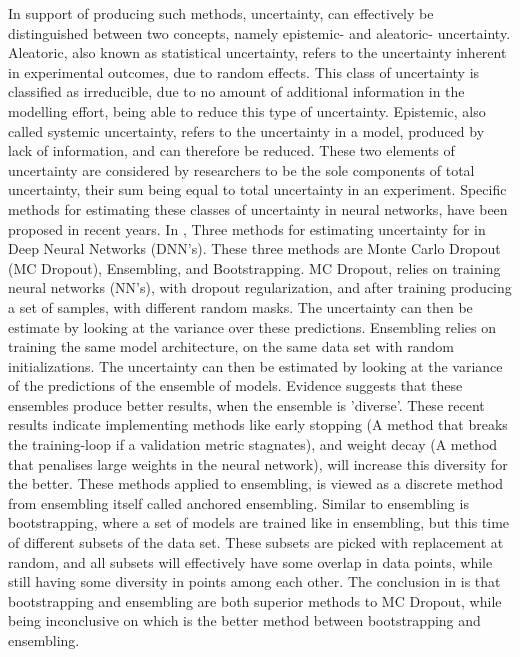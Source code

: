 In support of producing such methods, uncertainty, can effectively be distinguished between two concepts,
namely epistemic- and aleatoric- uncertainty\cite{Busk2021}\cite{AleatoricAndEpistemic}. Aleatoric, also known as statistical
uncertainty, refers to the uncertainty inherent in experimental outcomes, due to random effects. This class of uncertainty is
classified as irreducible, due to no amount of additional information in the modelling effort, being able to reduce this type
of uncertainty\cite{AleatoricAndEpistemic}. Epistemic, also called systemic uncertainty, refers to the uncertainty in a model,
produced by lack of information, and can therefore be reduced. These two elements of uncertainty are considered by researchers
to be the sole components of total uncertainty, their sum being equal to total uncertainty in an
experiment\cite{AleatoricAndEpistemic}. Specific methods for estimating these classes of uncertainty in neural networks,
have been proposed in recent years. In \cite{Scalia2019}, Three methods for estimating
uncertainty for in Deep Neural Networks (DNN's). These three methods are Monte Carlo Dropout (MC Dropout), Ensembling, and Bootstrapping.
MC Dropout, relies on training neural networks (NN's), with dropout regularization, and after training producing a set of samples,
with different random masks. The uncertainty can then be estimate by looking at the variance over these predictions.
Ensembling relies on training the same model architecture, on the same data set with random initializations.
The uncertainty can then be estimated by looking at the variance of the predictions of the ensemble of models.
Evidence suggests that these ensembles produce better results, when the ensemble is 'diverse'\cite{Pearce2018}.
These recent results indicate implementing methods like early stopping (A method that breaks the training-loop if a validation
metric stagnates), and weight decay (A method that penalises large weights in the neural network), will increase this
diversity for the better. These methods applied to ensembling, is viewed as a discrete method from ensembling
itself\cite{Scalia2019} called anchored ensembling. Similar to ensembling is bootstrapping, where a set of models are trained
like in ensembling, but this time of different subsets of the data set. These subsets are picked with replacement at random,
and all subsets will effectively have some overlap in data points, while still having some diversity in points among each other.
The conclusion in \cite{Scalia2019} is that bootstrapping and ensembling are both superior methods to MC Dropout, while
being inconclusive on which is the better method between bootstrapping and ensembling.\\


